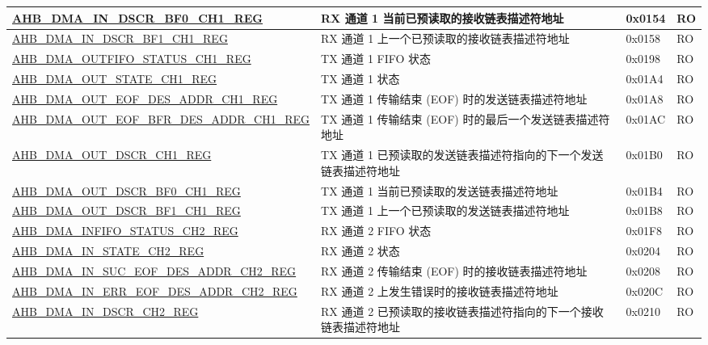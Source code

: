 \begin{longtable}{ | l | l | p{1.3cm} | l | }
\hyperref[regdesc:AHBDMAINDSCRBF0CHNREG]{AHB\_DMA\_IN\_DSCR\_BF0\_CH1\_REG} & RX 通道 1 当前已预读取的接收链表描述符地址 & 0x0154 & RO \\ \hline
\hyperref[regdesc:AHBDMAINDSCRBF1CHNREG]{AHB\_DMA\_IN\_DSCR\_BF1\_CH1\_REG} & RX 通道 1 上一个已预读取的接收链表描述符地址 & 0x0158 & RO \\ \hline
\hyperref[regdesc:AHBDMAOUTFIFOSTATUSCHNREG]{AHB\_DMA\_OUTFIFO\_STATUS\_CH1\_REG} & TX 通道 1 FIFO 状态 & 0x0198 & RO \\ \hline
\hyperref[regdesc:AHBDMAOUTSTATECHNREG]{AHB\_DMA\_OUT\_STATE\_CH1\_REG} & TX 通道 1 状态 & 0x01A4 & RO \\ \hline
\hyperref[regdesc:AHBDMAOUTEOFDESADDRCHNREG]{AHB\_DMA\_OUT\_EOF\_DES\_ADDR\_CH1\_REG} & TX 通道 1 传输结束 (EOF) 时的发送链表描述符地址 & 0x01A8 & RO \\ \hline
\hyperref[regdesc:AHBDMAOUTEOFBFRDESADDRCHNREG]{AHB\_DMA\_OUT\_EOF\_BFR\_DES\_ADDR\_CH1\_REG} & TX 通道 1 传输结束 (EOF) 时的最后一个发送链表描述符地址 & 0x01AC & RO \\ \hline
\hyperref[regdesc:AHBDMAOUTDSCRCHNREG]{AHB\_DMA\_OUT\_DSCR\_CH1\_REG} & TX 通道 1 已预读取的发送链表描述符指向的下一个发送链表描述符地址 & 0x01B0 & RO \\ \hline
\hyperref[regdesc:AHBDMAOUTDSCRBF0CHNREG]{AHB\_DMA\_OUT\_DSCR\_BF0\_CH1\_REG} & TX 通道 1 当前已预读取的发送链表描述符地址 & 0x01B4 & RO \\ \hline
\hyperref[regdesc:AHBDMAOUTDSCRBF1CHNREG]{AHB\_DMA\_OUT\_DSCR\_BF1\_CH1\_REG} & TX 通道 1 上一个已预读取的发送链表描述符地址 & 0x01B8 & RO \\ \hline
\hyperref[regdesc:AHBDMAINFIFOSTATUSCHNREG]{AHB\_DMA\_INFIFO\_STATUS\_CH2\_REG} & RX 通道 2 FIFO 状态 & 0x01F8 & RO \\ \hline
\hyperref[regdesc:AHBDMAINSTATECHNREG]{AHB\_DMA\_IN\_STATE\_CH2\_REG} & RX 通道 2 状态 & 0x0204 & RO \\ \hline
\hyperref[regdesc:AHBDMAINSUCEOFDESADDRCHNREG]{AHB\_DMA\_IN\_SUC\_EOF\_DES\_ADDR\_CH2\_REG} & RX 通道 2 传输结束 (EOF) 时的接收链表描述符地址 & 0x0208 & RO \\ \hline
\hyperref[regdesc:AHBDMAINERREOFDESADDRCHNREG]{AHB\_DMA\_IN\_ERR\_EOF\_DES\_ADDR\_CH2\_REG} & RX 通道 2 上发生错误时的接收链表描述符地址 & 0x020C & RO \\ \hline
\hyperref[regdesc:AHBDMAINDSCRCHNREG]{AHB\_DMA\_IN\_DSCR\_CH2\_REG} & RX 通道 2 已预读取的接收链表描述符指向的下一个接收链表描述符地址 & 0x0210 & RO \\ \hline

\end{longtable}
